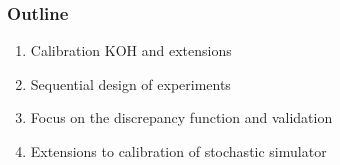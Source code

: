 \documentclass[nopagenumber,9pt]{beamer}
\begin{document}
\begin{frame}
 \frametitle{Outline}
 
 \begin{enumerate}
  \item Calibration KOH and extensions
  
  \item Sequential design of experiments
  
  \item Focus on the discrepancy function and validation
  
  \item Extensions to calibration of stochastic simulator
  
 \end{enumerate}

 
\end{frame}





\end{document}
